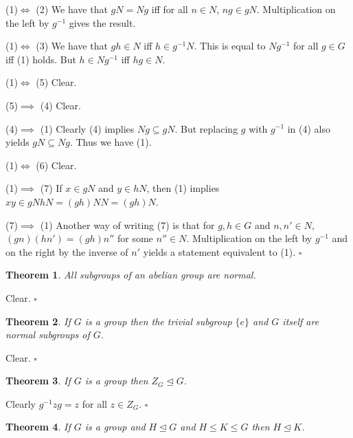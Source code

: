 \documentclass[10pt]{article}
\newtheorem{theorem}{Theorem}[section]
\newenvironment{proof}[1][Proof]{\begin{trivlist}
\item[\hskip \labelsep {\itshape #1}]}{\end{trivlist}}
\begin{document}
\begin{proof}
(1)$\iff$ (2) We have that $gN = Ng$ iff for all $n \in N$, $ng \in gN$. Multiplication on the left by $g^{-1}$ gives the result.

(1)$\iff$ (3) We have that $gh \in N$ iff $h \in g^{-1}N$. This is equal to $Ng^{-1}$ for all $g \in G$ iff (1) holds. But $h \in Ng^{-1}$ iff $hg \in N$.

(1)$\iff$ (5) Clear.

(5)$\implies$ (4) Clear.

(4)$\implies$ (1) Clearly (4) implies $Ng \subseteq gN$. But replacing $g$ with $g^{-1}$ in (4) also yields $gN \subseteq Ng$. Thus we have (1).

(1)$\iff$ (6) Clear.

(1)$\implies$ (7) If $x \in gN$ and $y \in hN$, then (1) implies $xy \in gNhN = (gh)NN = (gh)N$.

(7)$\implies$ (1) Another way of writing (7) is that for $g, h \in G$ and $n, n' \in N$, $(gn)(hn') = (gh)n''$ for some $n'' \in N$. Multiplication on the left by $g^{-1}$ and on the right by the inverse of $n'$ yields a statement equivalent to (1). $\square$
\end{proof}

\begin{theorem}
All subgroups of an abelian group are normal.
\end{theorem}

\begin{proof}
Clear. $\square$
\end{proof}

\begin{theorem}
If $G$ is a group then the trivial subgroup $\{e\}$ and $G$ itself are normal subgroups of $G$.
\end{theorem}

\begin{proof}
Clear. $\square$
\end{proof}

\begin{theorem}
If $G$ is a group then $Z_G \mathrel{\unlhd} G$.
\end{theorem}

\begin{proof}
Clearly $g^{-1}zg = z$ for all $z \in Z_G$. $\square$
\end{proof}

\begin{theorem}
If $G$ is a group and $H \mathrel{\unlhd} G$ and $H \leq K \leq G$ then $H \mathrel{\unlhd} K$.
\end{theorem}
\end{document}
